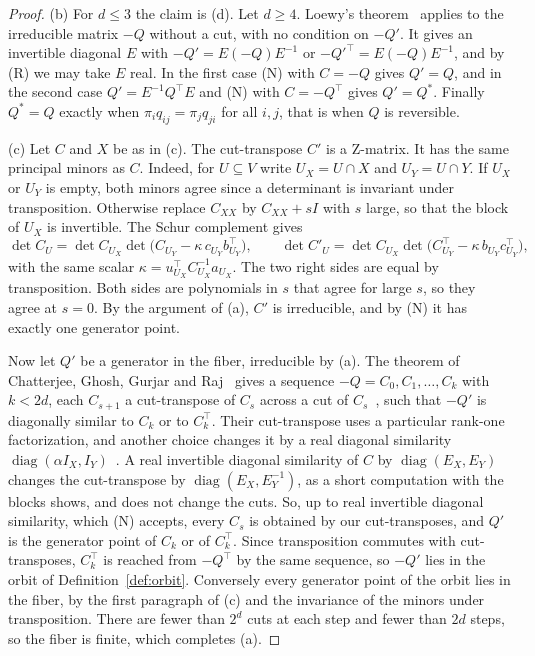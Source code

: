 \begin{proof}
(b) For $d\le3$ the claim is (d). Let $d\ge4$. Loewy's theorem~\cite[Theorem~1]{loewy1986}
applies to the irreducible matrix $-Q$ without a cut, with no condition on $-Q'$. It gives
an invertible diagonal $E$ with $-Q'=E(-Q)E^{-1}$ or $-Q'^\top=E(-Q)E^{-1}$, and by (R) we may
take $E$ real. In the first case (N) with $C=-Q$ gives $Q'=Q$, and in the second case
$Q'=E^{-1}Q^\top E$ and (N) with $C=-Q^\top$ gives $Q'=Q^*$. Finally $Q^*=Q$ exactly when
$\pi_iq_{ij}=\pi_jq_{ji}$ for all $i,j$, that is when $Q$ is reversible.

(c) Let $C$ and $X$ be as in (c). The cut-transpose $C'$ is a Z-matrix. It has the same
principal minors as $C$. Indeed, for $U\subseteq V$ write $U_X=U\cap X$ and $U_Y=U\cap Y$. If
$U_X$ or $U_Y$ is empty, both minors agree since a determinant is invariant under
transposition. Otherwise replace $C_{XX}$ by $C_{XX}+sI$ with $s$ large, so that the block
of $U_X$ is invertible. The Schur complement gives
\[
 \det C_U=\det C_{U_X}\det\bigl(C_{U_Y}-\kappa\,c_{U_Y}b_{U_Y}^\top\bigr),\qquad
 \det C'_U=\det C_{U_X}\det\bigl(C_{U_Y}^\top-\kappa\,b_{U_Y}c_{U_Y}^\top\bigr),
\]
with the same scalar $\kappa=u_{U_X}^\top C_{U_X}^{-1}a_{U_X}$. The two right sides are
equal by transposition. Both sides are polynomials in $s$ that agree for large $s$, so they
agree at $s=0$. By the argument of (a), $C'$ is irreducible, and by (N) it has exactly one
generator point.

Now let $Q'$ be a generator in the fiber, irreducible by (a). The theorem of Chatterjee,
Ghosh, Gurjar and Raj~\cite[Theorem~1.1]{cggr2024} gives a sequence
$-Q=C_0,C_1,\dots,C_k$ with $k<2d$, each $C_{s+1}$ a cut-transpose of $C_s$ across a cut of
$C_s$~\cite[Definition~2.10]{cggr2024}, such that $-Q'$ is diagonally similar to $C_k$ or to
$C_k^\top$. Their cut-transpose uses a particular rank-one factorization, and another choice
changes it by a real diagonal similarity $\operatorname{diag}(\alpha I_X,I_Y)$~\cite[Remark~2.11]{cggr2024}.
A real invertible diagonal similarity of $C$ by $\operatorname{diag}(E_X,E_Y)$ changes the
cut-transpose by $\operatorname{diag}(E_X,E_Y^{-1})$, as a short computation with the blocks
shows, and does not change the cuts. So, up to real invertible diagonal similarity, which
(N) accepts, every $C_s$ is obtained by our cut-transposes, and $Q'$ is the generator point
of $C_k$ or of $C_k^\top$. Since transposition commutes with cut-transposes, $C_k^\top$ is
reached from $-Q^\top$ by the same sequence, so $-Q'$ lies in the orbit of
Definition~\ref{def:orbit}. Conversely every generator point of the orbit lies in the fiber, by
the first paragraph of (c) and the invariance of the minors under transposition. There are
fewer than $2^d$ cuts at each step and fewer than $2d$ steps, so the fiber is finite, which
completes (a).


\end{proof}
